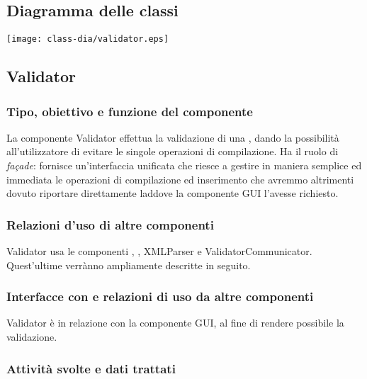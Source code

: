 \subsection{Diagramma delle classi}
\begin{center}
\texttt{[image: class-dia/validator.eps]}
\end{center}
\subsection{Validator}%
\subsubsection{Tipo, obiettivo e funzione del componente}
La componente Validator effettua la validazione di una \br, dando la possibilit\`a all'utilizzatore di evitare le singole operazioni di compilazione. Ha il ruolo di \textit{fa\c{c}ade}: fornisce un'interfaccia unificata che riesce a gestire in maniera semplice ed immediata le operazioni di compilazione ed inserimento che avremmo altrimenti dovuto riportare direttamente laddove la componente GUI l'avesse richiesto.
\subsubsection{Relazioni d'uso di altre componenti}
Validator usa le componenti \brp, \brl, XMLParser e ValidatorCommunicator. Quest'ultime verr\`anno ampliamente descritte in seguito.
\subsubsection{Interfacce con e relazioni di uso da altre componenti}
Validator \`e in relazione con la componente GUI, al fine di rendere possibile la validazione.
\subsubsection{Attivit\`a svolte e dati trattati}


